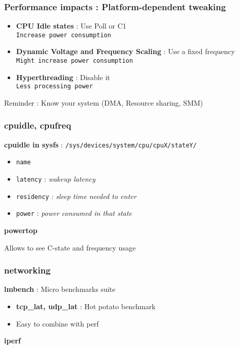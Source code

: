 \begin{frame}
	\frametitle{Performance impacts : Platform-dependent tweaking}
\begin{itemize}
	\item \textbf{CPU Idle states} : Use Poll or C1 \\ \small{\texttt{Increase power consumption}}
	\vspace{0.3cm}
	\item \textbf{Dynamic Voltage and Frequency Scaling} : Use a fixed frequency \\ \small{\texttt{Might increase power consumption}}
	\vspace{0.3cm}
	\item \textbf{Hyperthreading} : Disable it \\ \small{\texttt{Less processing power}}
\end{itemize}
	Reminder : Know your system (DMA, Resource sharing, SMM)	
\end{frame}

\begin{frame}
	\frametitle{cpuidle, cpufreq}
	\textbf{cpuidle in sysfs} : \texttt{/sys/devices/system/cpu/cpuX/stateY/}
	\begin{itemize}
		\item \texttt{name}
		\item \texttt{latency} : \textit{wakeup latency}
		\item \texttt{residency} : \textit{sleep time needed to enter}
		\item \texttt{power} : \textit{power consumed in that state}
	\end{itemize}

	\vspace{1cm}
	\textbf{powertop}

	Allows to see C-state and frequency usage
\end{frame}

\begin{frame}
	\frametitle{networking}

	\textbf{lmbench} : Micro benchmarks suite

	\begin{itemize}
		\item \textbf{tcp\_lat, udp\_lat} : Hot potato benchmark
		\item Easy to combine with perf
	\end{itemize}

	\textbf{iperf}

\end{frame}
